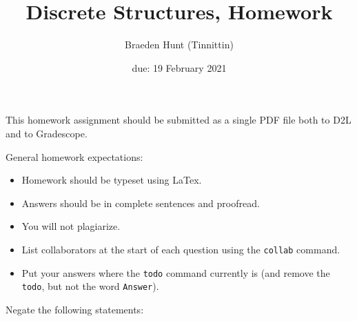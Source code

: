 \documentclass{article}
\title{Discrete Structures, Homework \hwnum}
\author{Braeden Hunt (Tinnittin)}
\date{due: 19 February 2021}
\begin{document}
\maketitle

This homework assignment should be
submitted as a single PDF file both to D2L and to Gradescope.

General homework expectations:
\begin{itemize}
    \item Homework should be typeset using LaTex.
    \item Answers should be in complete sentences and proofread.
    \item You will not plagiarize.  \item List collaborators at the start of each question using the \texttt{collab} command.
    \item Put your answers where the \texttt{todo} command currently is (and
        remove the \texttt{todo}, but not the word \texttt{Answer}).
\end{itemize}

 
Negate the following statements:
\end{document}
